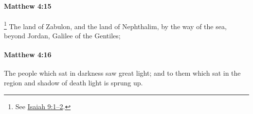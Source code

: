 		\paragraph{Matthew 4:15} %
			\label{MATTHEW-4-15}

				\footnote{%
					See \hyperref[ISAIAH-9-1]{Isaiah 9:1--2}.
					}%
			The land of Zabulon, and the land of Nephthalim, by the way of the sea, beyond Jordan, Galilee of the Gentiles;

			\begin{framed}
			\scriptsize
				\begin{compactdesc}
					\item[SBLG] 
				\end{compactdesc}
			\end{framed}

		\paragraph{Matthew 4:16} %
			\label{MATTHEW-4-16}

			The people which sat in darkness saw great light; and to them which sat in the region and shadow of death light is sprung up.

